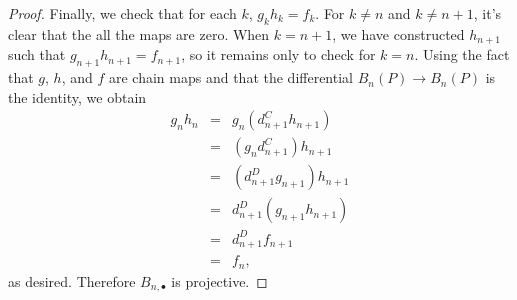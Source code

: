 \documentclass[10pt]{amsart}
\begin{document}
\begin{ex}
\begin{proof}
    Finally, we check that for each $k$, $g_kh_k = f_k$.
    For $k \neq n$ and $k \neq n+1$, it's clear that the all the maps are zero.
    When $k = n+1$, we have constructed $h_{n+1}$ such that $g_{n+1} h_{n+1} = f_{n+1}$, so it remains only to check for $k = n$.
    Using the fact that $g$, $h$, and $f$ are chain maps and that the differential $B_n(P) \rightarrow B_n(P)$ is the identity, we obtain
    \begin{eqnarray*}
      g_n h_n &=& g_n (d_{n+1}^C h_{n+1})\\
      &=& (g_n d_{n+1}^C) h_{n+1}\\
      &=& (d_{n+1}^D g_{n+1}) h_{n+1}\\
      &=& d_{n+1}^D (g_{n+1} h_{n+1})\\
      &=& d_{n+1}^D f_{n+1}\\
      &=& f_n,
    \end{eqnarray*}
    as desired.
    Therefore $B_{n,\bullet}$ is projective.
  \end{proof}
\end{ex}
\end{document}
